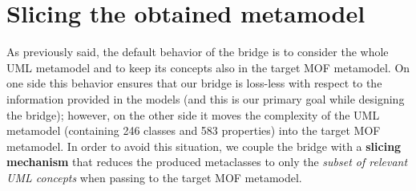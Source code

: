 

\section{Slicing the obtained metamodel}\label{sec:slicing}

As previously said, the default behavior of the bridge is to consider the whole UML metamodel and to keep its concepts also in the
target MOF metamodel. On one side this behavior ensures that our bridge is loss-less with respect to the information
provided in the models (and this is our primary goal while designing the bridge);
however, on the other side it moves the complexity of the UML metamodel (containing 246 classes and 583 properties)
into the target MOF metamodel.
In order to avoid this situation, we couple the bridge with a \textbf{slicing mechanism} that reduces the produced metaclasses
to only the \textit{subset of relevant UML concepts} when passing to the target MOF metamodel.

